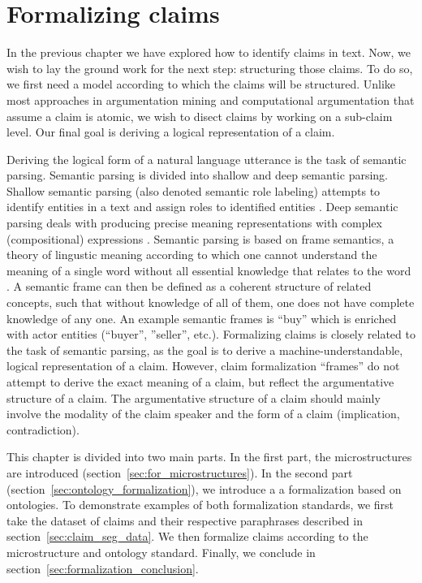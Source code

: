 \chapter{Formalizing claims}
\label{chap:formalization}

In the previous chapter we have explored how to identify claims in text.
Now, we wish to lay the ground work for the next step: structuring those claims. 
To do so, we first need a model according to which the claims will be structured. 
Unlike most approaches in argumentation mining and computational argumentation that
assume a claim is atomic, we wish to disect claims by working on a 
sub-claim level. Our final goal is deriving a logical representation of a claim. 

Deriving the logical form of a natural language utterance is the task of
semantic parsing. Semantic parsing is divided into shallow and deep semantic parsing. 
Shallow semantic parsing (also denoted semantic role labeling) attempts to
identify entities in a text and assign roles to identified entities
\citep{pradhan2004shallow}. 
Deep semantic parsing deals with producing precise meaning representations
with complex (compositional) expressions \citep{pasupat2015compositional}. 
Semantic parsing is based on frame semantics, a theory of lingustic meaning
according to which one cannot understand the meaning of a single word without
all essential knowledge that relates to the word \citep{fillmore2006frame}.
A semantic frame can then be defined as a coherent structure of related concepts,
such that without knowledge of all of them, one does not have complete knowledge
of any one. An example semantic frames is ``buy''  which is 
enriched with actor entities (``buyer'', ''seller'', etc.).
Formalizing claims is closely related to the task of semantic parsing, as the
goal is to derive a machine-understandable, logical representation of a claim.
However, claim formalization ``frames'' do not attempt to derive the exact
meaning of a claim, but reflect the argumentative structure of a claim. 
The argumentative structure of a claim should mainly involve the modality of the
claim speaker and the form of a claim (implication, contradiction). 

This chapter is divided into two main parts.  In the first part, the
microstructures are introduced (section~\ref{sec:for_microstructures}).
In the second part (section~\ref{sec:ontology_formalization}), we introduce a a
formalization based on ontologies. To demonstrate examples of both formalization
standards, we first take the dataset of claims and their respective paraphrases
described in section~\ref{sec:claim_seg_data}. We then formalize claims 
according to the microstructure and ontology standard.
Finally, we conclude in section~\ref{sec:formalization_conclusion}.

